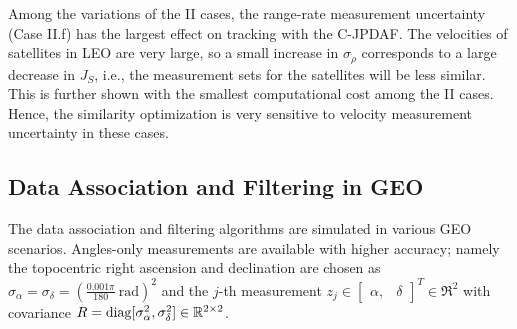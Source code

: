 Among the variations of the II cases, the range-rate measurement uncertainty (Case II.f) has the largest effect on tracking with the C-JPDAF.
The velocities of satellites in LEO are very large, so a small increase in $\sigma_{\dot\rho}$ corresponds to a large decrease in $J_S$, i.e., the measurement sets for the satellites will be less similar.  This is further shown with the smallest computational cost among the II cases.
Hence, the similarity optimization is very sensitive to velocity measurement uncertainty in these cases.




















\subsection{Data Association and Filtering in GEO}

The data association and filtering algorithms are simulated in various GEO scenarios.
Angles-only measurements are available with higher accuracy; namely the topocentric right ascension and declination are chosen as $\sigma_{\alpha}=\sigma_{\delta}=(\frac{0.001\pi}{180}\ \text{rad})^2$ and the $j$-th measurement $z_{j}\in\begin{bmatrix}\alpha, & \delta\end{bmatrix}^T\in\Re^2$ with covariance $R=\mathop{\mathrm{diag}}\nolimits[\sigma_{\alpha}^2, \sigma_{\delta}^2]\in\mathbb{R}^{2\times2}$.%













